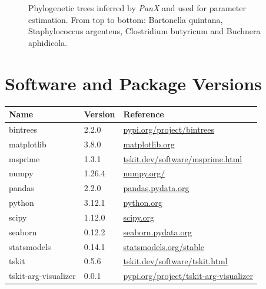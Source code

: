 \begin{figure}[H]
\begin{flushleft}
    \end{flushleft}
    \centering
    \caption[Trees for parameter estimation.]{Phylogenetic trees inferred by \textit{PanX} and used for parameter estimation.
        From top to bottom: Bartonella quintana, Staphylococcus argenteus, Clostridium butyricum and Buchnera aphidicola.}
    \label{app:panX-trees}
\end{figure}

\section{Software and Package Versions}
\begin{table}[H]
    \begin{tabular}{l|l|l}
        Name                 & Version & Reference                                                                                    \\
        \hline
        bintrees             & 2.2.0   & \href{https://pypi.org/project/bintrees/}{pypi.org/project/bintrees}                         \\
        matplotlib           & 3.8.0   & \href{https://matplotlib.org/}{matplotlib.org}                                               \\
        msprime              & 1.3.1   & \href{https://tskit.dev/software/msprime.html}{tskit.dev/software/msprime.html}              \\
        numpy                & 1.26.4  & \href{https://numpy.org/}{numpy.org/}                                                        \\
        pandas               & 2.2.0   & \href{https://pandas.pydata.org/}{pandas.pydata.org}                                         \\
        python               & 3.12.1  & \href{https://www.python.org/}{python.org}                                                   \\
        scipy                & 1.12.0  & \href{https://scipy.org/}{scipy.org}                                                         \\
        seaborn              & 0.12.2  & \href{https://seaborn.pydata.org/}{seaborn.pydata.org}                                       \\
        statsmodels          & 0.14.1  & \href{https://www.statsmodels.org/stable/index.html}{statsmodels.org/stable}                 \\
        tskit                & 0.5.6   & \href{https://tskit.dev/software/tskit.html}{tskit.dev/software/tskit.html}                  \\
        tskit-arg-visualizer & 0.0.1   & \href{https://pypi.org/project/tskit-arg-visualizer/}{pypi.org/project/tskit-arg-visualizer}
    \end{tabular}
    \label{app:package-versions}
\end{table}
